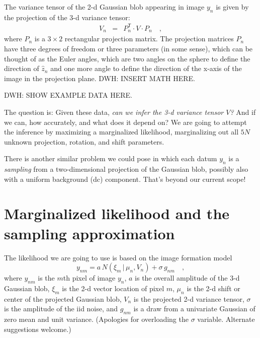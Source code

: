 \documentclass[12pt]{article}
\newcommand{\unitvec}[1]{\hat{#1}}
\newcommand{\zhat}{\unitvec{z}}
\newcommand{\normal}{N}
\newcommand{\given}{\,|\,}
\newcommand{\transpose}{^{\mathsf{T}}}
\begin{document}
The variance tensor of the 2-d Gaussian blob appearing in image $y_n$
is given by the projection of the 3-d variance tensor:
\begin{eqnarray}
  V_n &=& P_n\transpose\cdot V\cdot P_n
  \quad ,
\end{eqnarray}
where $P_n$ is a $3\times 2$ rectangular projection matrix.
The projection matrices $P_n$ have three degrees of freedom or three
parameters (in some sense), which can be thought of as the Euler
angles, which are two angles on the sphere to define the direction of
$\zhat_n$ and one more angle to define the direction of the x-axis of
the image in the projection plane.
DWH: INSERT MATH HERE.

DWH: SHOW EXAMPLE DATA HERE.

The question is:
Given these data, \emph{can we infer the 3-d variance tensor $V$?}
And if we can, how accurately, and what does it depend on?
We are going to attempt the inference by maximizing a marginalized
likelihood, marginalizing out all $5N$ unknown projection, rotation,
and shift parameters.

There is another similar problem we could pose in which each datum
$y_n$ is a \emph{sampling} from a two-dimensional projection of the
Gaussian blob, possibly also with a uniform background (dc) component.
That's beyond our current scope!

\section{Marginalized likelihood and the sampling approximation}

The likelihood we are going to use is based on the image formation
model
\begin{equation}
  y_{nm} = a\,\normal(\xi_m\given\mu_n,V_n) + \sigma\,g_{nm}
  \quad,
\end{equation}
where $y_{nm}$ is the $m$th pixel of image $y_n$,
$a$ is the overall amplitude of the 3-d Gaussian blob,
$\xi_m$ is the 2-d vector location of pixel $m$,
$\mu_n$ is the 2-d shift or center of the projected Gaussian blob,
$V_n$ is the projected 2-d variance tensor,
$\sigma$ is the amplitude of the iid noise,
and $g_{nm}$ is a draw from a univariate Gaussian of zero mean and unit variance.
(Apologies for overloading the $\sigma$ variable.
Alternate suggestions welcome.)
\end{document}
